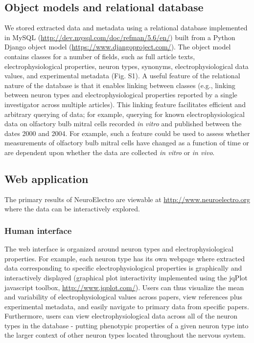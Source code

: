 \documentclass{template/frontiersSCNS} %
\begin{document}
\subsection{Object models and relational database}
We stored extracted data and metadata using a relational database implemented in MySQL (\url{http://dev.mysql.com/doc/refman/5.6/en/}) built from a Python Django object model (\url{https://www.djangoproject.com/}).  
The object model contains classes for a number of fields, such as full article texts, electrophysiological properties, neuron types, synonyms, electrophysiological data values, and experimental metadata (Fig. S1).  
A useful feature of the relational nature of the database is that it enables linking between classes (e.g., linking between neuron types and electrophysiological properties reported by a single investigator across multiple articles). 
This linking feature facilitates efficient and arbitrary querying of data; 
for example, querying for known electrophysiological data on olfactory bulb mitral cells recorded \emph{in vitro} and published between the dates 2000 and 2004.  
For example, such a feature could be used to assess whether measurements of olfactory bulb mitral cells have changed as a function of time or are dependent upon whether the data are collected \emph{in vitro} or \emph{in vivo}.

\subsection{Web application}
The primary results of NeuroElectro are viewable at \url{http://www.neuroelectro.org} where the data can be interactively explored.  

\subsubsection{Human interface}
The web interface is organized around neuron types and electrophysiological properties.  
For example, each neuron type has its own webpage where extracted data corresponding to specific electrophysiological properties is graphically and interactively displayed (graphical plot interactivity implemented using the jqPlot javascript toolbox, \url{http://www.jqplot.com/}).  
Users can thus visualize the mean and variability of electrophysiological values across papers, view references plus experimental metadata, and easily navigate to primary data from specific papers.  Furthermore, users can view electrophysiological data across all of the neuron types in the database - putting phenotypic properties of a given neuron type into the larger context of other neuron types located throughout the nervous system.
\end{document}
